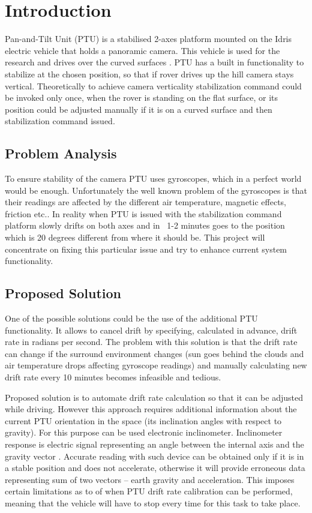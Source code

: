 \chapter{Introduction}
Pan-and-Tilt Unit (PTU) is a stabilised 2-axes platform mounted on the Idris electric vehicle that holds a panoramic camera. This vehicle is used for the research and drives over the curved surfaces \cite{ProjectIdris}. PTU has a built in functionality to stabilize at the chosen position, so that if rover drives up the hill camera stays vertical. Theoretically to achieve camera verticality stabilization command could be invoked only once, when the rover is standing on the flat surface, or its position could be adjusted manually if it is on a curved surface and then stabilization command issued. 

\section{Problem Analysis}
To ensure stability of the camera PTU uses gyroscopes, which in a perfect world would be enough. Unfortunately the well known problem of the gyroscopes is that their readings are affected by the different air temperature, magnetic effects, friction etc.\cite{HandbookOfModernSensors}. In reality when PTU is issued with the stabilization command platform slowly drifts on both axes and in ~1-2 minutes goes to the position which is 20 degrees different from where it should be. This project will concentrate on fixing this particular issue and try to enhance current system functionality.

\section{Proposed Solution}
One of the possible solutions could be the use of the additional PTU functionality. It allows to cancel drift by specifying, calculated in advance, drift rate in radians per second. The problem with this solution is that the drift rate can change if the surround environment changes (sun goes behind the clouds and air temperature drops affecting gyroscope readings) and manually calculating new drift rate every 10 minutes becomes infeasible and tedious. 

Proposed solution is to automate drift rate calculation so that it can be adjusted while driving. However this approach requires additional information about the current PTU orientation in the space (its inclination angles with respect to gravity). For this purpose can be used electronic inclinometer. Inclinometer response is electric signal representing an angle between the internal axis and the gravity vector \cite{HandbookOfModernSensors}. Accurate reading with such device can be obtained only if it is in a stable position and does not accelerate, otherwise it will provide erroneous data representing sum of two vectors – earth gravity and acceleration. This imposes certain limitations as to of when PTU drift rate calibration can be performed, meaning that the vehicle will have to stop every time for this task to take place.

